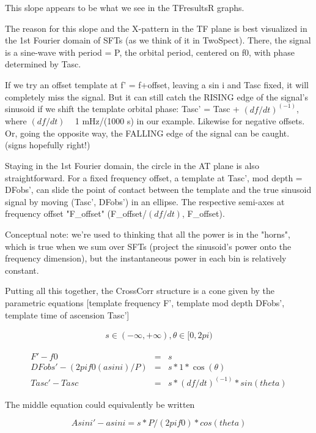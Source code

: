 \documentclass{article}
\begin{document}
This slope appears to be what we see in the TFresultsR graphs.

The reason for this slope and the X-pattern in the TF plane is best
visualized in the 1st Fourier domain of SFTs (as we think of it in
TwoSpect). There, the signal is a sine-wave with period = P, the orbital
period, centered on f0, with phase determined by Tasc.

If we try an offset template at f' = f+offset, leaving a sin i and Tasc
fixed, it will completely miss the signal. But it can still catch the
RISING edge of the signal's sinusoid if we shift the template orbital
phase: Tasc' = Tasc + $(df/dt)^(-1)$, where $(df/dt)$ ~ 1 mHz/(1000 s) in
our example. Likewise for negative offsets. Or, going the opposite way,
the FALLING edge of the signal can be caught. (signs hopefully right!)

Staying in the 1st Fourier domain, the circle in the AT plane is also
straightforward. For a fixed frequency offset, a template at Tasc', mod
depth = DFobs', can slide the point of contact between the template and
the true sinusoid signal by moving (Tasc', DFobs') in an ellipse. The
respective semi-axes at frequency offset "F\_offset" (F\_offset/$(df/dt)$,
F\_offset).

Conceptual note: we're used to thinking that all the power is in the
"horns", which is true when we sum over SFTs (project the sinusoid's
power onto the frequency dimension), but the instantaneous power in each
bin is relatively constant.

Putting all this together, the CrossCorr structure is a cone given by
the parametric equations [template frequency F', template mod depth
DFobs', template time of ascension Tasc']

\begin{eqnarray}
s \in (-\infty, +\infty), \theta \in [0, 2 pi)
\end{eqnarray}

\begin{eqnarray}
F' - f0                        &=& s\\
DFobs' - (2 pi f0 (a sin i)/P) &=& s * 1 * \cos(\theta)\\
Tasc' - Tasc                   &=& s * (df/dt)^(-1) * sin(theta)
\end{eqnarray}

The middle equation could equivalently be written

\begin{equation}
Asini' - a sin i = s * P/(2 pi f0) * cos(theta)
\end{equation}
\end{document}
